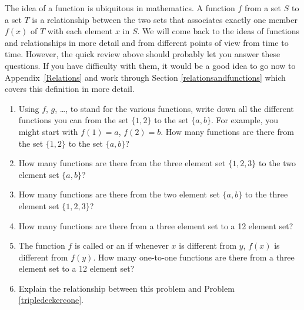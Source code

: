 \iteme The idea of a function is ubiquitous in mathematics.  A
function $f$ from a set $S$ to a set $T$ is a relationship
between the two sets that associates exactly one member $f(x)$
of $T$ with each element $x$ in $S$.    We
will come back to the ideas of functions and relationships in more detail and
from different points of view from time to time.  However, the quick review
above should probably let you answer these questions.  If you have difficulty
with them, it would be a good idea to go now to Appendix~\ref{Relations} and
work through Section \ref{relationsandfunctions} which covers this definition
in more detail.
\begin{enumerate} 
\item Using $f$, $g$, \ldots, to stand for the various
functions, write down all the different functions you can
from the set
$\{1,2\}$ to the set $\{a,b\}$.  For example, you might start
with
$f(1)=a$, $f(2)=b$.  How many functions are there from the
set $\{1,2\}$ to the set
$\{a,b\}$?\label{countingfunctionsparta}
\item How many functions are there from the three element set
$\{1,2,3\}$
 to the two element set $\{a,b\}$?
\item How many functions are there from the two element set $\{a,b\}$ to the
three element set $\{1,2,3\}$?
\item  How many functions are there from a three element set
to a 12 element set? 
\item The function $f$ is called
 or an
 if whenever
$x$ is different from
$y$,
$f(x)$ is different from $f(y)$.  How many one-to-one
functions are there from a three element set to a  12 element
set? 
\item Explain the relationship between this problem and Problem
\ref{tripledeckercone}.
\end{enumerate}\label{countingfunctions}



